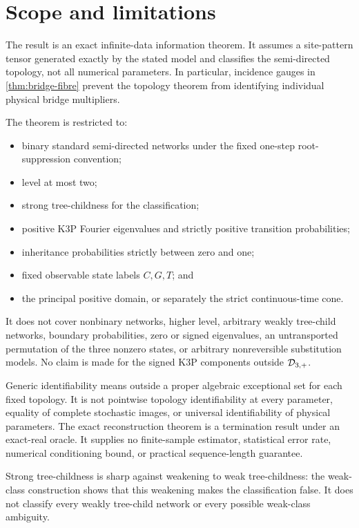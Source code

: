 \section{Scope and limitations}\label{sec:scope}

The result is an exact infinite-data information theorem.  It assumes a
site-pattern tensor generated exactly by the stated model and classifies the
semi-directed topology, not all numerical parameters.  In particular,
incidence gauges in \cref{thm:bridge-fibre} prevent the topology theorem from
identifying individual physical bridge multipliers.

The theorem is restricted to:

\begin{itemize}
  \item binary standard semi-directed networks under the fixed one-step
        root-suppression convention;
  \item level at most two;
  \item strong tree-childness for the classification;
  \item positive K3P Fourier eigenvalues and strictly positive transition
        probabilities;
  \item inheritance probabilities strictly between zero and one;
  \item fixed observable state labels \(C,G,T\); and
  \item the principal positive domain, or separately the strict
        continuous-time cone.
\end{itemize}

It does not cover nonbinary networks, higher level, arbitrary weakly
tree-child networks, boundary probabilities, zero or signed eigenvalues, an
untransported permutation of the three nonzero states, or arbitrary
nonreversible substitution models.  No claim is made for the signed K3P
components outside \(\mathcal D_{3,+}\).

Generic identifiability means outside a proper algebraic exceptional set for
each fixed topology.  It is not pointwise topology identifiability at every
parameter, equality of complete stochastic images, or universal
identifiability of physical parameters.  The exact reconstruction theorem is
a termination result under an exact-real oracle.  It supplies no finite-sample
estimator, statistical error rate, numerical conditioning bound, or practical
sequence-length guarantee.

Strong tree-childness is sharp against weakening to weak tree-childness: the
weak-class construction shows that this weakening makes the classification false.  It
does not classify every weakly tree-child network or every possible weak-class
ambiguity.
